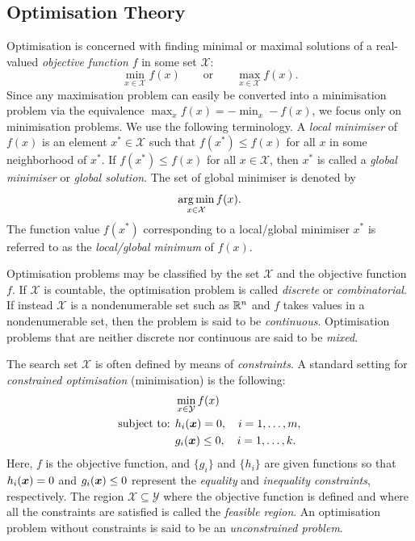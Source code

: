 \subsection{Optimisation Theory} \label{sec:OptimisationTheory}
Optimisation is concerned with finding minimal or maximal solutions of a real-valued \textit{objective function} \(f\) in some set \(\mathcal{X}\):
\begin{equation}
	\min_{x \in \mathcal{X}} f(x) \qquad \text{or} \qquad \max_{x \in \mathcal{X}} f(x). \label{eq:OptimizationDef}
\end{equation}
Since any maximisation problem can easily be converted into a minimisation problem via the equivalence \(\max_x f(x) = -\min_x -f(x)\), we focus only on minimisation problems. We use the following terminology. A \textit{local minimiser} of \(f(x)\) is an element \(x^* \in \mathcal{X}\) such that \(f(x^*) \le f(x)\) for all \(x\) in some neighborhood of \(x^*\). If \(f(x^*) \le f(x)\) for all \(x \in \mathcal{X}\), then \(x^*\) is called a \textit{global minimiser} or \textit{global solution}. The set of global minimiser is denoted by
\begin{equation*}
	\operatorname*{arg\,min}_{x \in \mathcal{X}} f(x).
\end{equation*}
The function value \(f(x^*)\) corresponding to a local/global minimiser \(x^*\) is referred to as the \textit{local/global minimum} of \(f(x)\).

Optimisation problems may be classified by the set \(\mathcal{X}\) and the objective function \(f\). If \(\mathcal{X}\) is countable, the optimisation problem is called \textit{discrete} or \textit{combinatorial}. If instead \(\mathcal{X}\) is a nondenumerable set such as \(\mathbb{R}^n\) and \(f\) takes values in a nondenumerable set, then the problem is said to be \textit{continuous}. Optimisation problems that are neither discrete nor continuous are said to be \textit{mixed}.

The search set \(\mathcal{X}\) is often defined by means of \textit{constraints}. A standard setting for \textit{constrained optimisation} (minimisation) is the following:
\begin{equation}
	\begin{split}
		                    & \min_{x \in \mathcal{Y}} f(x)               \\
		\text{subject to: } & h_i(\boldsymbol{x}) = 0, \quad i = 1, \dots, m,   \\
		                    & g_i(\boldsymbol{x}) \le 0, \quad i = 1, \dots, k.
	\end{split} \label{eq:ConstrainedOptimization}
\end{equation}
Here, \(f\) is the objective function, and \(\{g_i\}\) and \(\{h_i\}\) are given functions so that \(h_i(\boldsymbol{x}) = 0\) and \(g_i(\boldsymbol{x}) \le 0\) represent the \textit{equality} and \textit{inequality constraints}, respectively. The region \(\mathcal{X} \subseteq \mathcal{Y}\) where the objective function is defined and where all the constraints are satisfied is called the \textit{feasible region}. An optimisation problem without constraints is said to be an \textit{unconstrained problem}.

